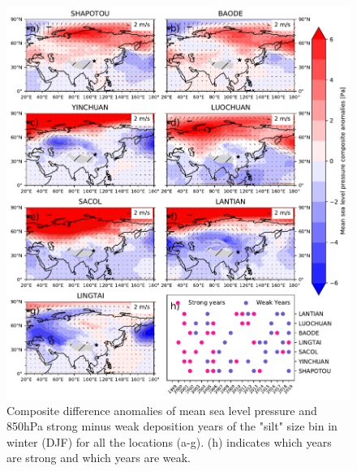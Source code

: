 \begin{figure}[hp]
    \centering
    \includegraphics[width=\textwidth]{texfiles/figs/mslp_850hPa_20micron_DJF.pdf}
    \caption{Composite difference anomalies of mean sea level pressure and 850hPa strong minus weak deposition years of the "silt" size bin in winter (DJF) for all the locations (a-g).  (h) indicates which years are strong and which years are weak.}
    \label{fig:DJF_850_coarse_composite}
\end{figure}

